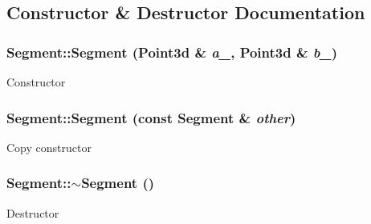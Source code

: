 \subsection{Constructor \& Destructor Documentation}
\hypertarget{classCartWheel_1_1Math_1_1Segment_aa08e590d8d326480b6f8f303215afdcd}{
\subsubsection[{Segment}]{\setlength{\rightskip}{0pt plus 5cm}Segment::Segment ({\bf Point3d} \& {\em a\_\-}, \/  {\bf Point3d} \& {\em b\_\-})}}
\label{classCartWheel_1_1Math_1_1Segment_aa08e590d8d326480b6f8f303215afdcd}
Constructor \hypertarget{classCartWheel_1_1Math_1_1Segment_a3b4b9d164de5fa476b607c7b49a71742}{
\subsubsection[{Segment}]{\setlength{\rightskip}{0pt plus 5cm}Segment::Segment (const {\bf Segment} \& {\em other})}}
\label{classCartWheel_1_1Math_1_1Segment_a3b4b9d164de5fa476b607c7b49a71742}
Copy constructor \hypertarget{classCartWheel_1_1Math_1_1Segment_a76b45a453304f1f485e3bc2fcad58b59}{
\subsubsection[{$\sim$Segment}]{\setlength{\rightskip}{0pt plus 5cm}Segment::$\sim$Segment ()}}
\label{classCartWheel_1_1Math_1_1Segment_a76b45a453304f1f485e3bc2fcad58b59}
Destructor 

